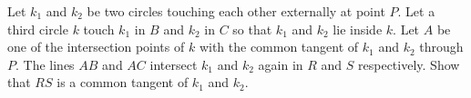 Let $k_1$ and $k_2$ be two circles touching each other externally at point $P$.
Let a third circle $k$ touch $k_1$ in $B$ and $k_2$ in $C$ so that $k_1$ and $k_2$ lie inside $k$.
Let $A$ be one of the intersection points of $k$ with the common
tangent of $k_1$ and $k_2$ through $P$.
The lines $AB$ and $AC$ intersect $k_1$ and $k_2$ again in $R$ and $S$ respectively.
Show that $RS$ is a common tangent of $k_1$ and $k_2$.
